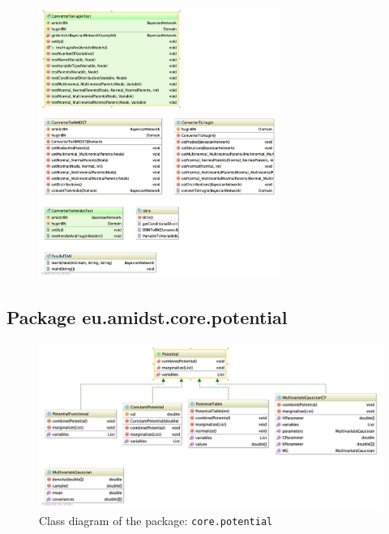 \begin{figure}[H]
  \centering
    \includegraphics[width=0.7\textwidth]{ClassDiagrams/core_huginlink.jpg}
\end{figure}


\subsection{Package eu.amidst.core.potential}

\begin{figure}[H]
  \caption{Class diagram of the package: \texttt{core.potential}}
  \centering
    \includegraphics[width=\textwidth]{ClassDiagrams/core_potential.jpg}
\end{figure}

